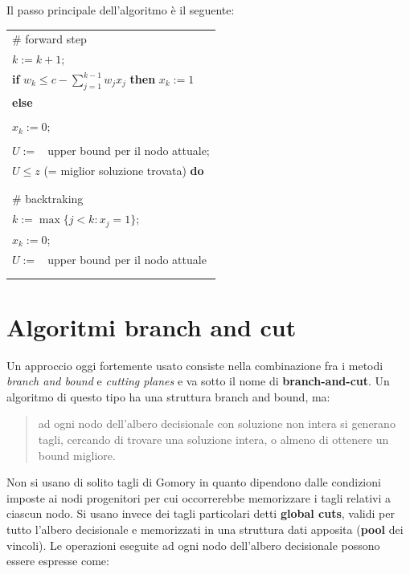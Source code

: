 \documentclass[11pt]{book}
\begin{document}
Il passo principale dell'algoritmo \`e il seguente:

\vspace{11pt}
\begin{center}
\begin{tabular}{||l||}
\hline\hline
\# forward step\\
$k:=k+1;$\\
{\bf if} $w_k \leq c - \sum\limits_{j=1}^{k-1}w_jx_j$ {\bf then}
$x_k:=1$\\
{\bf else}\\
\phantom{aa}{\bf begin}\\
\phantom{aaaa}$x_k := 0;$\\
\\
\phantom{aaaa}$U :=\phantom{a}$ upper bound per il nodo attuale;\\
\phantom{aaaa}{\bf while} $U \leq z$ (= miglior soluzione trovata) {\bf do}\\
\phantom{aaaaaa}{\bf begin}\\
\\
\phantom{aaaaaaaa}\# backtraking\\
\phantom{aaaaaaaa}$k := \max\{ j<k: x_j = 1\};$\\
\phantom{aaaaaaaa}$x_k:=0$;\\
\phantom{aaaaaaaa}$U :=\phantom{a}$ upper bound per il nodo attuale\\
\phantom{aaaaaa}{\bf end}\\
\phantom{aaaa}{\bf end}\\
\hline\hline
\end{tabular}
\end{center}
\vspace{11pt}

\section{Algoritmi branch and cut}

Un approccio oggi fortemente usato consiste nella combinazione fra i
metodi {\em branch and bound} e {\em cutting planes} e va sotto il
nome di {\bf branch-and-cut}. Un algoritmo di questo tipo ha una
struttura branch and bound, ma:

\begin{quote}
ad ogni nodo dell'albero decisionale con soluzione non intera si
generano tagli, cercando di trovare una soluzione intera, o almeno di
ottenere un bound migliore.
\end{quote}

Non si usano di solito tagli di Gomory in quanto dipendono dalle
condizioni imposte ai nodi progenitori per cui occorrerebbe
memorizzare i tagli relativi a ciascun nodo. Si usano invece dei tagli
particolari detti {\bf global cuts}, validi per tutto l'albero
decisionale e memorizzati in una struttura dati apposita ({\bf pool}
dei vincoli). Le operazioni eseguite ad ogni nodo dell'albero
decisionale possono essere espresse come:
\end{document}
